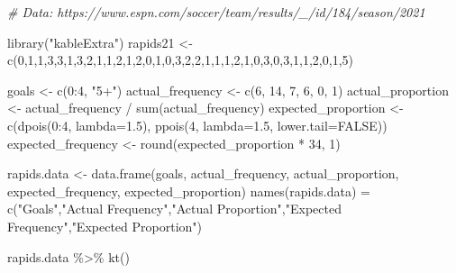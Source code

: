 \documentclass[
  11pt,
]{book}
\newenvironment{Shaded}{\begin{snugshade}}{\end{snugshade}}
\newcommand{\AttributeTok}[1]{\textcolor[rgb]{0.77,0.63,0.00}{#1}}
\newcommand{\CommentTok}[1]{\textcolor[rgb]{0.56,0.35,0.01}{\textit{#1}}}
\newcommand{\ConstantTok}[1]{\textcolor[rgb]{0.00,0.00,0.00}{#1}}
\newcommand{\DecValTok}[1]{\textcolor[rgb]{0.00,0.00,0.81}{#1}}
\newcommand{\FloatTok}[1]{\textcolor[rgb]{0.00,0.00,0.81}{#1}}
\newcommand{\FunctionTok}[1]{\textcolor[rgb]{0.00,0.00,0.00}{#1}}
\newcommand{\NormalTok}[1]{#1}
\newcommand{\OtherTok}[1]{\textcolor[rgb]{0.56,0.35,0.01}{#1}}
\newcommand{\SpecialCharTok}[1]{\textcolor[rgb]{0.00,0.00,0.00}{#1}}
\newcommand{\StringTok}[1]{\textcolor[rgb]{0.31,0.60,0.02}{#1}}
\theoremstyle{definition}
\theoremstyle{definition}
\theoremstyle{definition}
\theoremstyle{definition}
\theoremstyle{remark}
\begin{document}
\begin{Shaded}
\begin{Highlighting}[]
\CommentTok{\# Data: https://www.espn.com/soccer/team/results/\_/id/184/season/2021}

\FunctionTok{library}\NormalTok{(}\StringTok{"kableExtra"}\NormalTok{)}
\NormalTok{rapids21 }\OtherTok{\textless{}{-}} 
  \FunctionTok{c}\NormalTok{(}\DecValTok{0}\NormalTok{,}\DecValTok{1}\NormalTok{,}\DecValTok{1}\NormalTok{,}\DecValTok{3}\NormalTok{,}\DecValTok{3}\NormalTok{,}\DecValTok{1}\NormalTok{,}\DecValTok{3}\NormalTok{,}\DecValTok{2}\NormalTok{,}\DecValTok{1}\NormalTok{,}\DecValTok{1}\NormalTok{,}\DecValTok{2}\NormalTok{,}\DecValTok{1}\NormalTok{,}\DecValTok{2}\NormalTok{,}\DecValTok{0}\NormalTok{,}\DecValTok{1}\NormalTok{,}\DecValTok{0}\NormalTok{,}\DecValTok{3}\NormalTok{,}\DecValTok{2}\NormalTok{,}\DecValTok{2}\NormalTok{,}\DecValTok{1}\NormalTok{,}\DecValTok{1}\NormalTok{,}\DecValTok{1}\NormalTok{,}\DecValTok{2}\NormalTok{,}\DecValTok{1}\NormalTok{,}\DecValTok{0}\NormalTok{,}\DecValTok{3}\NormalTok{,}\DecValTok{0}\NormalTok{,}\DecValTok{3}\NormalTok{,}\DecValTok{1}\NormalTok{,}\DecValTok{1}\NormalTok{,}\DecValTok{2}\NormalTok{,}\DecValTok{0}\NormalTok{,}\DecValTok{1}\NormalTok{,}\DecValTok{5}\NormalTok{)}

\NormalTok{goals }\OtherTok{\textless{}{-}} \FunctionTok{c}\NormalTok{(}\DecValTok{0}\SpecialCharTok{:}\DecValTok{4}\NormalTok{, }\StringTok{"5+"}\NormalTok{)}
\NormalTok{actual\_frequency }\OtherTok{\textless{}{-}} \FunctionTok{c}\NormalTok{(}\DecValTok{6}\NormalTok{, }\DecValTok{14}\NormalTok{, }\DecValTok{7}\NormalTok{, }\DecValTok{6}\NormalTok{, }\DecValTok{0}\NormalTok{, }\DecValTok{1}\NormalTok{)}
\NormalTok{actual\_proportion }\OtherTok{\textless{}{-}}\NormalTok{ actual\_frequency }\SpecialCharTok{/} \FunctionTok{sum}\NormalTok{(actual\_frequency)}
\NormalTok{expected\_proportion }\OtherTok{\textless{}{-}} \FunctionTok{c}\NormalTok{(}\FunctionTok{dpois}\NormalTok{(}\DecValTok{0}\SpecialCharTok{:}\DecValTok{4}\NormalTok{, }\AttributeTok{lambda=}\FloatTok{1.5}\NormalTok{), }
                         \FunctionTok{ppois}\NormalTok{(}\DecValTok{4}\NormalTok{, }\AttributeTok{lambda=}\FloatTok{1.5}\NormalTok{, }\AttributeTok{lower.tail=}\ConstantTok{FALSE}\NormalTok{))}
\NormalTok{expected\_frequency }\OtherTok{\textless{}{-}} \FunctionTok{round}\NormalTok{(expected\_proportion }\SpecialCharTok{*} \DecValTok{34}\NormalTok{, }\DecValTok{1}\NormalTok{)}

\NormalTok{rapids.data }\OtherTok{\textless{}{-}} \FunctionTok{data.frame}\NormalTok{(goals, actual\_frequency, actual\_proportion, }
\NormalTok{                          expected\_frequency, expected\_proportion)}
\FunctionTok{names}\NormalTok{(rapids.data) }\OtherTok{=} \FunctionTok{c}\NormalTok{(}\StringTok{"Goals"}\NormalTok{,}\StringTok{"Actual Frequency"}\NormalTok{,}\StringTok{"Actual Proportion"}\NormalTok{,}\StringTok{"Expected Frequency"}\NormalTok{,}\StringTok{"Expected Proportion"}\NormalTok{)}

\NormalTok{rapids.data }\SpecialCharTok{\%\textgreater{}\%} \FunctionTok{kt}\NormalTok{()}
\end{Highlighting}
\end{Shaded}
\end{document}
